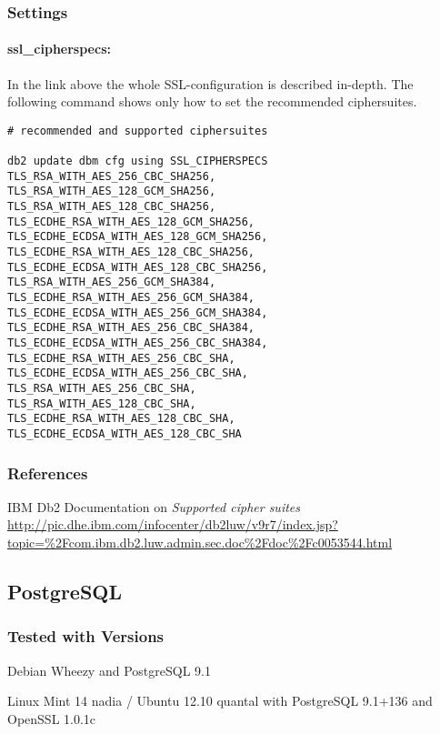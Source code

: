 \subsubsection{Settings}
\paragraph{ssl\_cipherspecs:}
In the link above the whole SSL-configuration is described in-depth. The following command shows only how to set the recommended ciphersuites.
\begin{lstlisting}
# recommended and supported ciphersuites 

db2 update dbm cfg using SSL_CIPHERSPECS 
TLS_RSA_WITH_AES_256_CBC_SHA256,
TLS_RSA_WITH_AES_128_GCM_SHA256,
TLS_RSA_WITH_AES_128_CBC_SHA256,
TLS_ECDHE_RSA_WITH_AES_128_GCM_SHA256,
TLS_ECDHE_ECDSA_WITH_AES_128_GCM_SHA256,
TLS_ECDHE_RSA_WITH_AES_128_CBC_SHA256,
TLS_ECDHE_ECDSA_WITH_AES_128_CBC_SHA256,
TLS_RSA_WITH_AES_256_GCM_SHA384,
TLS_ECDHE_RSA_WITH_AES_256_GCM_SHA384,
TLS_ECDHE_ECDSA_WITH_AES_256_GCM_SHA384,
TLS_ECDHE_RSA_WITH_AES_256_CBC_SHA384,
TLS_ECDHE_ECDSA_WITH_AES_256_CBC_SHA384,
TLS_ECDHE_RSA_WITH_AES_256_CBC_SHA,
TLS_ECDHE_ECDSA_WITH_AES_256_CBC_SHA,
TLS_RSA_WITH_AES_256_CBC_SHA,
TLS_RSA_WITH_AES_128_CBC_SHA,
TLS_ECDHE_RSA_WITH_AES_128_CBC_SHA,
TLS_ECDHE_ECDSA_WITH_AES_128_CBC_SHA
\end{lstlisting}


\subsubsection{References}
\begin{itemize*}
  \item IBM Db2 Documentation on \emph{Supported cipher suites} \url{http://pic.dhe.ibm.com/infocenter/db2luw/v9r7/index.jsp?topic=\%2Fcom.ibm.db2.luw.admin.sec.doc\%2Fdoc\%2Fc0053544.html}
\end{itemize*}


\subsection{PostgreSQL}
\subsubsection{Tested with Versions}
\begin{itemize*}
  \item Debian Wheezy and PostgreSQL 9.1
  \item Linux Mint 14 nadia / Ubuntu 12.10 quantal with PostgreSQL 9.1+136 and OpenSSL 1.0.1c
\end{itemize*}


